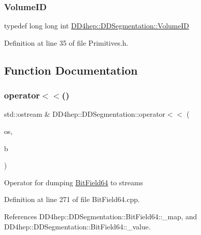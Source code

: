 \subsubsection{\texorpdfstring{Volume\+ID}{VolumeID}}
{\footnotesize\ttfamily typedef long long int \hyperlink{namespace_d_d4hep_1_1_d_d_segmentation_a61a6833a18d1800bdef176595f83e3ba}{D\+D4hep\+::\+D\+D\+Segmentation\+::\+Volume\+ID}}



Definition at line 35 of file Primitives.\+h.



\subsection{Function Documentation}
\hypertarget{namespace_d_d4hep_1_1_d_d_segmentation_a113bdacd047bf42526854d70d3d8ff8b}{}\label{namespace_d_d4hep_1_1_d_d_segmentation_a113bdacd047bf42526854d70d3d8ff8b} 
\subsubsection{\texorpdfstring{operator$<$$<$()}{operator<<()}}
{\footnotesize\ttfamily std\+::ostream \& D\+D4hep\+::\+D\+D\+Segmentation\+::operator$<$$<$ (\begin{DoxyParamCaption}\item[{std\+::ostream \&}]{os,  }\item[{const \hyperlink{class_d_d4hep_1_1_d_d_segmentation_1_1_bit_field64}{Bit\+Field64} \&}]{b }\end{DoxyParamCaption})}

Operator for dumping \hyperlink{class_d_d4hep_1_1_d_d_segmentation_1_1_bit_field64}{Bit\+Field64} to streams 

Definition at line 271 of file Bit\+Field64.\+cpp.



References D\+D4hep\+::\+D\+D\+Segmentation\+::\+Bit\+Field64\+::\+\_\+map, and D\+D4hep\+::\+D\+D\+Segmentation\+::\+Bit\+Field64\+::\+\_\+value.

\hypertarget{namespace_d_d4hep_1_1_d_d_segmentation_a74ba39ad0902cab359c0022d295ffb99}{}\label{namespace_d_d4hep_1_1_d_d_segmentation_a74ba39ad0902cab359c0022d295ffb99} 
